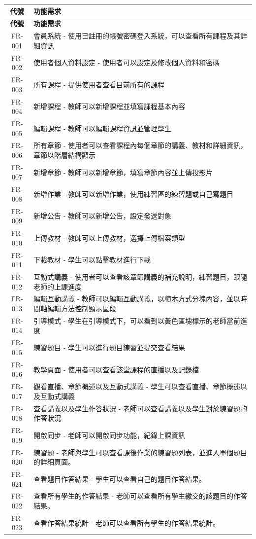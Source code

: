 \documentclass[12pt]{article}
\begin{document}
\begin{longtable}{|c|p{15cm}|}
  \hline
  \textbf{代號} & \textbf{功能需求} \\
  \hline
  \endfirsthead %
  \hline
  \textbf{代號} & \textbf{功能需求} \\
  \hline
  \endhead %
  FR-001 & 會員系統 - 使用已註冊的帳號密碼登入系統，可以查看所有課程及其詳細資訊 \\  \hline
  FR-002 & 使用者個人資料設定 - 使用者可以設定及修改個人資料和密碼 \\  \hline
  FR-003 & 所有課程 - 提供使用者查看目前所有的課程 \\  \hline
  FR-004 & 新增課程 - 教師可以新增課程並填寫課程基本內容 \\  \hline
  FR-005 & 編輯課程 - 教師可以編輯課程資訊並管理學生 \\  \hline
  FR-006 & 所有章節 - 使用者可以查看課程內每個章節的講義、教材和詳細資訊，章節以階層結構顯示 \\  \hline
  FR-007 & 新增章節 - 教師可以新增章節，填寫章節內容並上傳投影片 \\  \hline
  FR-008 & 新增作業 - 教師可以新增作業，使用練習區的練習題或自己寫題目 \\  \hline
  FR-009 & 新增公告 - 教師可以新增公告，設定發送對象 \\  \hline
  FR-010 & 上傳教材 - 教師可以上傳教材，選擇上傳檔案類型 \\  \hline
  FR-011 & 下載教材 - 學生可以點擊教材進行下載 \\  \hline
  FR-012 & 互動式講義 - 使用者可以查看該章節講義的補充說明，練習題目，跟隨老師的上課進度 \\  \hline
  FR-013 & 編輯互動講義 - 教師可以編輯互動講義，以積木方式分塊內容，並以時間軸編輯方法控制顯示區段 \\  \hline
  FR-014 & 引導模式 - 學生在引導模式下，可以看到以黃色區塊標示的老師當前進度 \\  \hline
  FR-015 & 練習題目 - 學生可以進行題目練習並提交查看結果 \\  \hline
  FR-016 & 教學頁面 - 使用者可以查看該堂課程的直播以及記錄檔 \\  \hline
  FR-017 & 觀看直播、章節概述以及互動式講義 - 學生可以查看直播、章節概述以及互動式講義 \\  \hline
  FR-018 & 查看講義以及學生作答狀況 - 老師可以查看講義以及學生對於練習題的作答狀況 \\  \hline
  FR-019 & 開啟同步 - 老師可以開啟同步功能，紀錄上課資訊 \\  \hline
  FR-020 & 練習題 - 老師與學生可以查看課後作業的練習題列表，並進入單個題目的詳細頁面。\\ \hline
  FR-021 & 查看題目作答結果 - 學生可以查看自己的題目作答結果。 \\ \hline
  FR-022 & 查看所有學生的作答結果 - 老師可以查看所有學生繳交的該題目的作答結果。 \\ \hline 
  FR-023 & 查看作答結果統計 - 老師可以查看所有學生的作答結果統計。 \\ \hline
\end{longtable}
\end{document}
